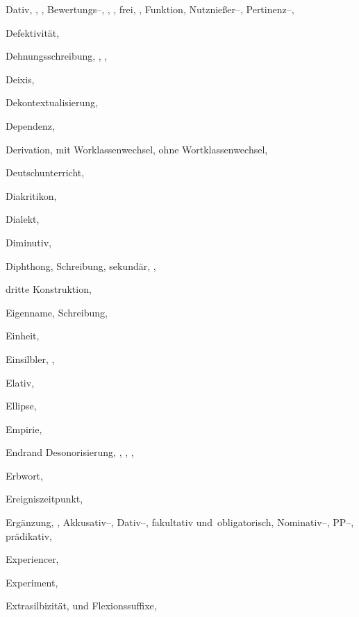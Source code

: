 \begin{theindex}
  \indexspace

  \item Dativ, , , 
    \subitem Bewertungs--, , , 
    \subitem frei, , 
    \subitem Funktion, 
    \subitem Nutznießer--, 
    \subitem Pertinenz--, 
  \item Defektivität, 
  \item Dehnungsschreibung, , , 
  \item Deixis, 
  \item Dekontextualisierung, 
  \item Dependenz, 
  \item Derivation, 
    \subitem mit Worklassenwechsel, 
    \subitem ohne Wortklassenwechsel, 
  \item Deutschunterricht, 
  \item Diakritikon, 
  \item Dialekt, 
  \item Diminutiv, 
  \item Diphthong, 
    \subitem Schreibung, 
    \subitem sekundär, , 
  \item dritte Konstruktion, 

  \indexspace

  \item Eigenname, 
    \subitem Schreibung, 
  \item Einheit, 
  \item Einsilbler, , 
  \item Elativ, 
  \item Ellipse, 
  \item Empirie, 
  \item Endrand
    \subitem Desonorisierung, , , 
		, 
  \item Erbwort, 
  \item Ereigniszeitpunkt, 
  \item Ergänzung, , 
    \subitem Akkusativ--, 
    \subitem Dativ--, 
    \subitem fakultativ und obligatorisch, 
    \subitem Nominativ--, 
    \subitem PP--, 
    \subitem prädikativ, 
  \item Experiencer, 
  \item Experiment, 
  \item Extrasilbizität, 
    \subitem und Flexionssuffixe, 


\end{theindex}
